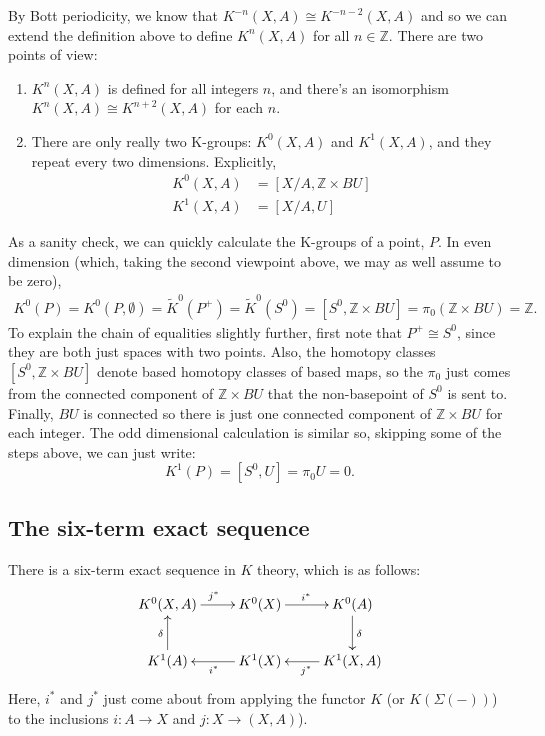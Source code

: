\documentclass[a4paper,10pt]{article}
\theoremstyle{plain}%
\theoremstyle{definition}
\theoremstyle{remark}
\newcommand{\ZZ}{\mathbb{Z}}
\begin{document}
By Bott periodicity, we know that $K^{-n}(X,A) \cong K^{-n-2}(X,A)$
and so we can extend the definition above to define $K^n(X,A)$ for all
$n \in \ZZ$. There are two points of view:
\begin{enumerate}
\item $K^n(X,A)$ is defined for all integers $n$, and there's an
  isomorphism $K^{n}(X,A) \cong K^{n+2}(X,A)$ for each $n$.

\item There are only really two K-groups: $K^0(X,A)$ and $K^1(X,A)$,
  and they repeat every two dimensions. Explicitly,
  \begin{align*}
    K^0(X,A) &= [X/A, \ZZ\times BU]\\
    K^1(X,A) &= [X/A, U]
  \end{align*}
\end{enumerate}

As a sanity check, we can quickly calculate the K-groups of a point,
$P$. In even dimension (which, taking the second viewpoint above, we
may as well assume to be zero),
\begin{align*}
  K^0(P) = K^0(P, \emptyset) = \tilde{K}^0(P^+) = \tilde{K}^0(S^0)
  = [S^0, \ZZ\times BU] = \pi_0(\ZZ \times BU) = \ZZ.
\end{align*}
To explain the chain of equalities slightly further, first note that
$P^+ \cong S^0$, since they are both just spaces with two
points. Also, the homotopy classes $[S^0, \ZZ\times BU]$ denote based
homotopy classes of based maps, so the $\pi_0$ just comes from the
connected component of $\ZZ\times BU$ that the non-basepoint of $S^0$
is sent to. Finally, $BU$ is connected so there is just one connected
component of $\ZZ\times BU$ for each integer. The odd dimensional
calculation is similar so, skipping some of the steps above, we can
just write:
\begin{equation*}
  K^1(P) = [S^0, U] = \pi_0U = 0.
\end{equation*}

\subsection{The six-term exact sequence}

There is a six-term exact sequence in $K$ theory, which is as follows:
\begin{equation}
  \label{stes}
  \xymatrix{
    K^0(X,A) \ar[r]^{j^*} & K^0(X) \ar[r]^{i^*} & K^0(A)\ar[d]^{\delta}\\
    K^1(A)\ar[u]^{\delta} & K^1(X)\ar[l]^{i^*} & K^1(X,A)\ar[l]^{j^*}
  }
\end{equation}
Here, $i^*$ and $j^*$ just come about from applying the functor $K$
(or $K(\Sigma(-))$) to the inclusions $i: A\to X$ and $j: X\to
(X,A)$).
\end{document}
